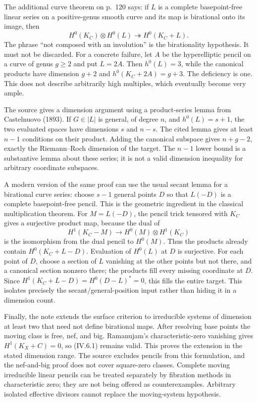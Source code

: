 The additional curve theorem on p.~120 says: if \(L\) is a complete basepoint-free linear series on a positive-genus smooth curve and its map is birational onto its image, then \[
 H^0(K_C)\otimes H^0(L)\twoheadrightarrow H^0(K_C+L).
 \tag{IV.6.2}
\] The phrase ``not composed with an involution'' is the birationality hypothesis. It must not be discarded. For a concrete failure, let \(A\) be the hyperelliptic pencil on a curve of genus \(g\geq2\) and put \(L=2A\). Then \(h^0(L)=3\), while the canonical products have dimension \(g+2\) and \(h^0(K_C+2A)=g+3\). The deficiency is one. This does not describe arbitrarily high multiples, which eventually become very ample.

The source gives a dimension argument using a product-series lemma from Castelnuovo (1893). If \(G\in|L|\) is general, of degree \(n\), and \(h^0(L)=s+1\), the two evaluated spaces have dimensions \(s\) and \(n-s\). The cited lemma gives at least \(n-1\) conditions on their product. Adding the canonical subspace gives \(n+g-2\), exactly the Riemann--Roch dimension of the target. The \(n-1\) lower bound is a substantive lemma about these series; it is not a valid dimension inequality for arbitrary coordinate subspaces.

A modern version of the same proof can use the usual secant lemma for a birational curve series: choose \(s-1\) general points \(D\) so that \(L(-D)\) is a complete basepoint-free pencil. This is the geometric ingredient in the classical multiplication theorem. For \(M=L(-D)\), the pencil trick tensored with \(K_C\) gives a surjective product map, because the dual of \[
 H^1(K_C-M)\longrightarrow H^0(M)\otimes H^1(K_C)
\] is the isomorphism from the dual pencil to \(H^0(M)\). Thus the products already contain \(H^0(K_C+L-D)\). Evaluation of \(H^0(L)\) at \(D\) is surjective. For each point of \(D\), choose a section of \(L\) vanishing at the other points but not there, and a canonical section nonzero there; the products fill every missing coordinate at \(D\). Since \(H^1(K_C+L-D)=H^0(D-L)^*=0\), this fills the entire target. This isolates precisely the secant/general-position input rather than hiding it in a dimension count.

Finally, the note extends the surface criterion to irreducible systems of dimension at least two that need not define birational maps. After resolving base points the moving class is free, nef, and big. Ramanujam's characteristic-zero vanishing gives \(H^1(K_X+C)=0\), so (IV.6.1) remains valid. This proves the extension in the stated dimension range. The source excludes pencils from this formulation, and the nef-and-big proof does not cover square-zero classes. Complete moving irreducible linear pencils can be treated separately by fibration methods in characteristic zero; they are not being offered as counterexamples. Arbitrary isolated effective divisors cannot replace the moving-system hypothesis.


